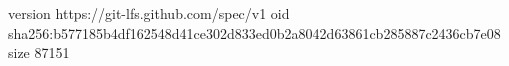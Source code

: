 version https://git-lfs.github.com/spec/v1
oid sha256:b577185b4df162548d41ce302d833ed0b2a8042d63861cb285887c2436cb7e08
size 87151
